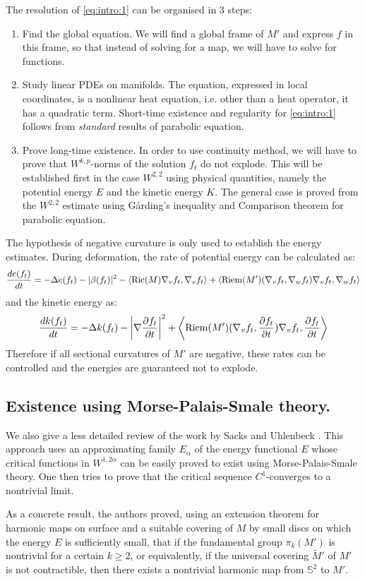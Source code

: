 The resolution of \eqref{eq:intro:1} can be organised in 3 steps:
\begin{enumerate}
\item Find the global equation. We will find a global frame of \(M'\) and express
\(f\) in this frame, so that instead of solving for a map, we will have to solve for functions.
\item Study linear PDEs on manifolds. The equation, expressed in local coordinates, is a nonlinear heat equation, i.e. other
than a heat operator, it has a quadratic term. Short-time existence and regularity for \eqref{eq:intro:1} follows from \emph{standard} results of
parabolic equation.
\item Prove long-time existence. In order to use continuity method, we will have to prove
that \(W^{k,p}\)-norms of the solution \(f_t\) do not explode. This will be
established first in the case \(W^{2,2}\) using physical quantities, namely the
potential energy \(E\) and the kinetic energy \(K\). The general case is proved
from the \(W^{2,2}\) estimate using Gårding's inequality and Comparison theorem for
parabolic equation.
\end{enumerate}

The hypothesis of negative curvature is only used to establish the energy
estimates. During deformation, the rate of potential energy can be calculated as: 
\[
 \frac{d e(f_t)}{dt}= -\Delta e(f_t) - |\beta(f_t)|^2 - \left\langle \mathop{\rm Ric}\nolimits(M) \nabla_v
f_t,\nabla_v f_t \rangle + \langle \mathop{\rm Riem}\nolimits(M') (\nabla_v f_t,\nabla_w f_t)\nabla_v
f_t,\nabla_w f_t \right\rangle
\]
and the kinetic energy as:
\[
 \frac{d k(f_t)}{dt}= -\Delta k(f_t) - \left|\nabla \frac{\partial f_t}{\partial t}\right|^2 +
\left\langle \mathop{\rm Riem}\nolimits(M') (\nabla_v f_t,\frac{\partial f_t}{\partial t})\nabla_v
f_t,\frac{\partial f_t}{\partial t} \right\rangle
\]
Therefore if all sectional curvatures of \(M'\) are negative, these rates can be
controlled and the energies are guaranteed not to explode.

\subsection{Existence using Morse-Palais-Smale theory.}
\label{sec:orgc4e17a9}
We also give a less detailed review of the work by Sacks and Uhlenbeck
\cite{sacks_existence_1981}. This approach uses an approximating family \(E_\alpha\) of the energy functional \(E\) whose critical functions in \(W^{1,2\alpha}\) can be easily proved
to exist using Morse-Palais-Smale theory. One then tries to prove that the critical sequence
\(C^1\)-converges to a nontrivial limit. 

As a concrete result, the authors proved,
using an extension theorem for harmonic maps on surface and a suitable covering of \(M\) by small discs on which the energy \(E\) is sufficiently small, that if
the fundamental group \(\pi_k(M')\) is nontrivial for a certain \(k\geq 2\), or
equivalently, if the universal covering \(\tilde M'\) of \(M'\) is not contractible,
then there exists a nontrivial harmonic map from \(\mathbb{S}^2\) to \(M'\).


\iffalse


\fi
